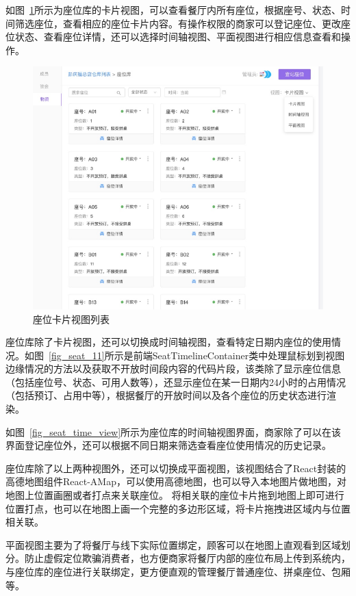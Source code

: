 如图~\ref{fig_seat_list}所示为座位库的卡片视图，可以查看餐厅内所有座位，根据座号、状态、时间筛选座位，查看相应的座位卡片内容。有操作权限的商家可以登记座位、更改座位状态、查看座位详情，还可以选择时间轴视图、平面视图进行相应信息查看和操作。

\begin{figure}[htbp!]
    \centering
    \includegraphics[width=4.5in]{FIGs/chapter4/seat_list.pdf}
    \caption{座位卡片视图列表}\label{fig_seat_list}
\end{figure}

座位库除了卡片视图，还可以切换成时间轴视图，查看特定日期内座位的使用情况。如图~\ref{fig_seat_11}所示是前端SeatTimelineContainer类中处理鼠标划到视图边缘情况的方法以及获取不开放时间段内容的代码片段，该类除了显示座位信息（包括座位号、状态、可用人数等），还显示座位在某一日期内24小时的占用情况（包括预订、占用中等），根据餐厅的开放时间以及各个座位的历史状态进行渲染。

如图~\ref{fig_seat_time_view}所示为座位库的时间轴视图界面，商家除了可以在该界面登记座位外，还可以根据不同日期来筛选查看座位使用情况的历史记录。

座位库除了以上两种视图外，还可以切换成平面视图，该视图结合了React封装的高德地图组件React-AMap，可以使用高德地图，也可以导入本地图片做地图，对地图上位置画圈或者打点来关联座位。
将相关联的座位卡片拖到地图上即可进行位置打点，也可以在地图上画一个完整的多边形区域，将卡片拖拽进区域内与位置相关联。

平面视图主要为了将餐厅与线下实际位置绑定，顾客可以在地图上直观看到区域划分。防止虚假定位欺骗消费者，也方便商家将餐厅内部的座位布局上传到系统内，与座位库的座位进行关联绑定，更方便直观的管理餐厅普通座位、拼桌座位、包厢等。

